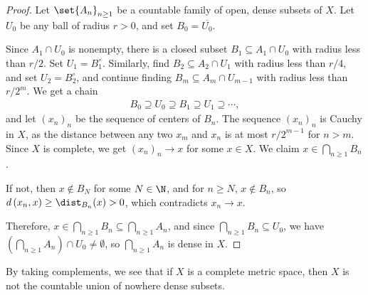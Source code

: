 \documentclass[10pt]{mypackage}
\begin{document}
\begin{proof}
  Let $\set{A_n}_{n\geq 1}$ be a countable family of open, dense subsets of $X$. Let $U_0$ be any ball of radius $r > 0$, and set $B_0 = \overline{U_0}$.\newline

  Since $A_1\cap U_0$ is nonempty, there is a closed subset $B_1\subseteq A_1\cap U_0$ with radius less than $r/2$. Set $U_1 = B_1^{\circ}$. Similarly, find $B_2\subseteq A_2\cap U_1$ with radius less than $r/4$, and set $U_2 = B_2^{\circ}$, and continue finding $B_m\subseteq A_m\cap U_{m-1}$ with radius less than $r/2^{m}$. We get a chain
  \begin{align*}
    B_0 \supseteq U_0\supseteq B_1\supseteq U_1\supseteq \cdots,
  \end{align*}
  and let $\left( x_n \right)_n$ be the sequence of centers of $B_n$. The sequence $\left( x_n \right)_n$ is Cauchy in $X$, as the distance between any two $x_m$ and $x_n$ is at most $r/2^{m-1}$ for $n > m$. Since $X$ is complete, we get $\left( x_n \right)_n\rightarrow x$ for some $x\in X$. We claim $x\in \bigcap_{n\geq 1}B_n$.\newline

  If not, then $x\notin B_{N}$ for some $N\in \N$, and for $n \geq N$, $x\notin B_n$, so $d\left( x_n,x \right) \geq \dist_{B_n}(x) > 0$, which contradicts $x_n\rightarrow x$.\newline

  Therefore, $x\in \bigcap_{n\geq 1}B_n\subseteq \bigcap_{n\geq 1}A_n$, and since $\bigcap_{n\geq 1}B_n\subseteq U_0$, we have $\left( \bigcap_{n\geq 1}A_n \right)\cap U_0 \neq \emptyset$, so $\bigcap_{n\geq 1}A_n$ is dense in $X$.
\end{proof}
\begin{remark}
  By taking complements, we see that if $X$ is a complete metric space, then $X$ is not the countable union of nowhere dense subsets.
\end{remark}
\end{document}
